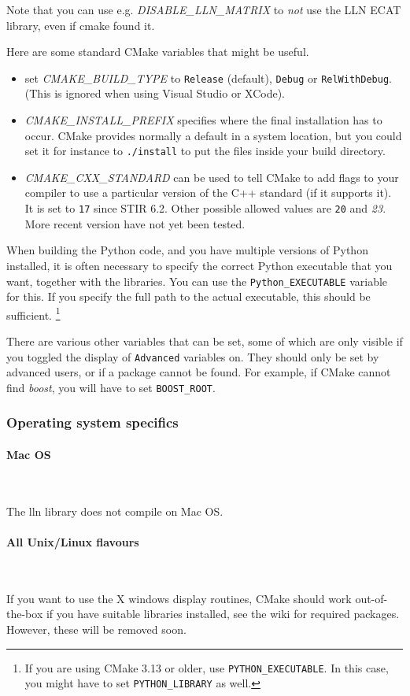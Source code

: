\documentclass{article}
\newcommand{\subsubsubsection}[1]{\paragraph{#1}\mbox{} \\}
\begin{document}
Note that you can use e.g. \textit{DISABLE\_LLN\_MATRIX} to \textit{not}
use the LLN ECAT library, even if cmake found it.

Here are some standard CMake variables that might be useful.
\begin{itemize}
\item set \textit{CMAKE\_BUILD\_TYPE} to \texttt{Release} (default), \texttt{Debug} or \texttt{RelWithDebug}.
(This is ignored when using Visual Studio or XCode).
\item \textit{CMAKE\_INSTALL\_PREFIX} specifies where the final installation has to occur. CMake
provides normally a default in a system location, but you could set it for instance to
\texttt{./install} to put the files inside your build directory.
\item \textit{CMAKE\_CXX\_STANDARD} can be used to tell CMake to add flags to your compiler to use
a particular version of the C++ standard (if it supports it). It is set 
to \texttt{17} since STIR 6.2. Other possible allowed values are
\texttt{20} and \textit{23}. More recent version have not yet been tested.
\end{itemize}

When building the Python code, and you have multiple versions of Python installed,
it is often necessary to specify the correct Python executable that you want, together with
the libraries. You can use the \texttt{Python\_EXECUTABLE} variable for this. If you
specify the full path to the actual executable, this should be sufficient.
\footnote{If you are using CMake 3.13 or older, use \texttt{PYTHON\_EXECUTABLE}.
In this case, you might have to set \texttt{PYTHON\_LIBRARY} as well.}

There are various other variables that can be set, some of which are only visible if you toggled
the display of \texttt{Advanced} variables on. They should only be set by advanced users, or if a package
cannot be found. For example, if CMake cannot find \textit{boost}, you will have to set \texttt{BOOST\_ROOT}.

\subsubsection{
Operating system specifics}

{ \subsubsubsection{Mac OS}
}

The lln library does not compile on Mac OS. 

{ \subsubsubsection{All Unix/Linux flavours}
}

If you want to use the X windows display routines,  CMake
should work out-of-the-box if you have suitable libraries installed, see the wiki
for required packages. However, these will be removed soon.
\end{document}

